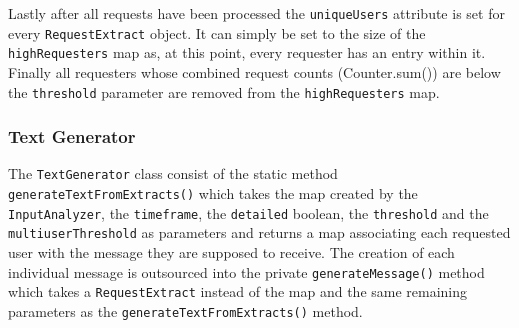 \documentclass[sigconf,obeyspaces]{acmart}
\begin{document}
Lastly after all requests have been processed the \texttt{uniqueUsers} attribute is set for every \texttt{RequestExtract} object. It can simply be set to the size of the \texttt{highRequesters} map as, at this point, every requester has an entry within it. Finally all requesters whose combined request counts (Counter.sum()) are below the \texttt{threshold} parameter are removed from the \texttt{highRequesters} map.

\subsubsection{Text Generator}
The \texttt{TextGenerator} class consist of the static method \texttt{generateTextFromExtracts()} which takes the map created by the \texttt{InputAnalyzer}, the \texttt{timeframe}, the \texttt{detailed} boolean, the \texttt{threshold} and the \texttt{multiuserThreshold} as parameters and returns a map associating each requested user with the message they are supposed to receive. The creation of each individual message is outsourced into the private \texttt{generateMessage()} method which takes a \texttt{RequestExtract} instead of the map and the same remaining parameters as the \texttt{generateTextFromExtracts()} method.
\end{document}
